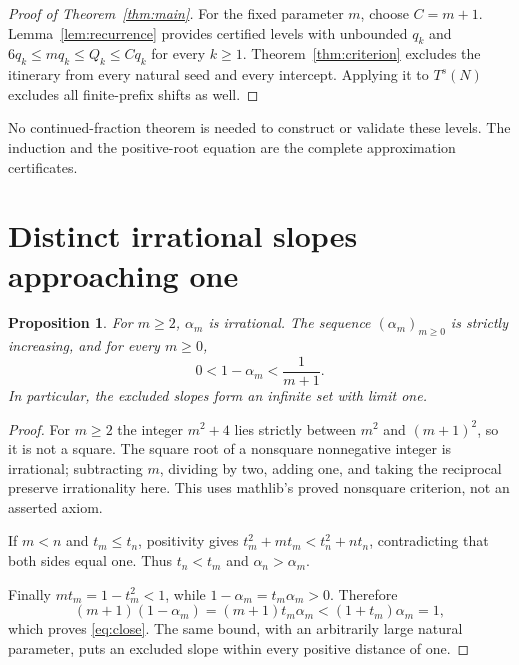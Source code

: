 \documentclass[11pt]{article}
\newtheorem{proposition}[theorem]{Proposition}
\theoremstyle{remark}
\begin{document}
\begin{proof}[Proof of Theorem~\ref{thm:main}]
For the fixed parameter $m$, choose $C=m+1$. Lemma~\ref{lem:recurrence}
provides certified levels with unbounded $q_k$ and
$6q_k\le mq_k\le Q_k\le Cq_k$ for every $k\ge1$.
Theorem~\ref{thm:criterion} excludes the itinerary from every natural seed
and every intercept. Applying it to $T^s(N)$ excludes all finite-prefix
shifts as well.
\end{proof}
No continued-fraction theorem is needed to construct or validate these
levels. The induction and the positive-root equation are the complete
approximation certificates.

\section{Distinct irrational slopes approaching one}
\begin{proposition}\label{prop:geometry}
For $m\ge2$, $\alpha_m$ is irrational. The sequence $(\alpha_m)_{m\ge0}$
is strictly increasing, and for every $m\ge0$,
\begin{equation}\label{eq:close}
0<1-\alpha_m<\frac1{m+1}.
\end{equation}
In particular, the excluded slopes form an infinite set with limit one.
\end{proposition}
\begin{proof}
For $m\ge2$ the integer $m^2+4$ lies strictly between $m^2$ and
$(m+1)^2$, so it is not a square. The square root of a nonsquare
nonnegative integer is irrational; subtracting $m$, dividing by two,
adding one, and taking the reciprocal preserve irrationality here.
This uses mathlib's proved nonsquare criterion, not an asserted axiom.

If $m<n$ and $t_m\le t_n$, positivity gives
$t_m^2+mt_m<t_n^2+nt_n$, contradicting that both sides equal one.
Thus $t_n<t_m$ and $\alpha_n>\alpha_m$.

Finally $mt_m=1-t_m^2<1$, while
$1-\alpha_m=t_m\alpha_m>0$. Therefore
\[
(m+1)(1-\alpha_m)=(m+1)t_m\alpha_m
<(1+t_m)\alpha_m=1,
\]
which proves \eqref{eq:close}. The same bound, with an arbitrarily large
natural parameter, puts an excluded slope within every positive distance
of one.
\end{proof}
\end{document}

